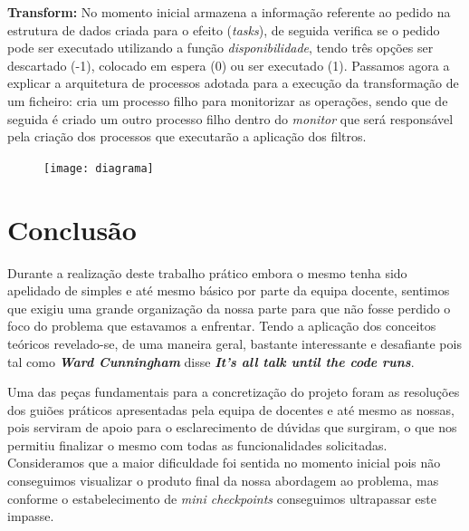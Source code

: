 \documentclass[11pt,a4paper]{report}
\begin{document}
\textbf{Transform: } No momento inicial armazena a informação referente ao pedido na estrutura de dados criada para o efeito (\emph{tasks}), de seguida verifica se o pedido pode ser executado utilizando a função \emph{disponibilidade}, tendo três opções ser descartado (-1), colocado em espera (0) ou ser executado (1). Passamos agora a explicar a arquitetura de processos adotada para a execução da transformação de um ficheiro: cria um processo filho para monitorizar as operações, sendo que de seguida é criado um outro processo filho dentro do \emph{monitor} que será responsável pela criação dos processos que executarão a aplicação dos filtros.

\begin{figure}[h]
    \centering
    \texttt{[image: diagrama]}
\end{figure}

\chapter{Conclusão}

Durante a realização deste trabalho prático embora o mesmo tenha sido apelidado de simples e até mesmo básico por parte da equipa docente, sentimos que exigiu uma grande organização da nossa parte para que não fosse perdido o foco do problema que estavamos a enfrentar. Tendo a aplicação dos conceitos teóricos revelado-se, de uma maneira geral, bastante interessante e desafiante pois tal como \emph{\textbf{Ward Cunningham}} disse \emph{\textbf{It's all talk until the code runs}}. 

Uma das peças fundamentais para a concretização do projeto foram as resoluções dos guiões práticos apresentadas pela equipa de docentes e até mesmo as nossas, pois serviram de apoio para o esclarecimento de dúvidas que surgiram, o que nos permitiu finalizar o mesmo com todas as funcionalidades solicitadas. Consideramos que a maior dificuldade foi sentida no momento inicial pois não conseguimos visualizar o produto final da nossa abordagem ao problema, mas conforme o estabelecimento de \emph{mini checkpoints} conseguimos ultrapassar este impasse.
\end{document}
